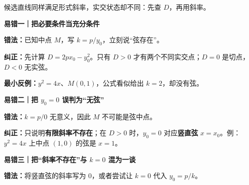 \begin{trapbox}
\par
\begin{minipage}{\linewidth}
\begin{center}

\par\small 候选直线同样满足形式斜率，实交状态却不同：先查 $D$，再用斜率。
\end{center}
\end{minipage}
\par


\par\medskip
\begin{minipage}{\linewidth}
\noindent
\textbf{\textcolor{CTrap}{易错一｜把必要条件当充分条件}}\par\nobreak\smallskip
\par\noindent\textbf{错法：}已知中点 $M$，写 $k=p/y_0$，立刻说“弦存在”。\par
\end{minipage}
\par

\par\noindent\textbf{纠正：}先计算 $D=2px_0-y_0^2$。只有 $D>0$ 才有两个不同实交点；$D=0$ 是切点，$D<0$ 无实弦。
\par\noindent\textbf{最小反例：}$y^2=4x$、$M(0,1)$，公式看似给出 $k=2$，却没有弦。
\par\medskip
\begin{minipage}{\linewidth}
\noindent
\textbf{\textcolor{CTrap}{易错二｜把 $y_0=0$ 误判为“无弦”}}\par\nobreak\smallskip
\par\noindent\textbf{错法：}$k=p/0$ 无意义，因此 $M$ 不可能是弦中点。\par
\end{minipage}
\par

\par\noindent\textbf{纠正：}只说明\textbf{有限斜率不存在}；在 $D>0$ 时，$y_0=0$ 对应\textbf{竖直弦} $x=x_0$。例：$y^2=4x$ 上中点 $(1,0)$ 的弦是 $x=1$。
\par\medskip
\begin{minipage}{\linewidth}
\noindent
\textbf{\textcolor{CTrap}{易错三｜把“斜率不存在”与 $k=0$ 混为一谈}}\par\nobreak\smallskip
\par\noindent\textbf{错法：}将竖直弦的斜率写为 $0$，或者尝试让 $k=0$ 代入 $y_0=p/k$。\par
\end{minipage}
\par


\end{trapbox}
